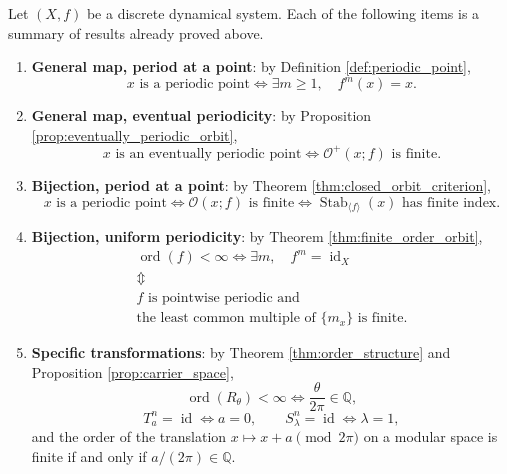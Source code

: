 \begin{theorem}\label{thm:period_type_master_criterion}
Let \((X,f)\) be a discrete dynamical system. Each of the following items is a summary of results already proved above.
\begin{enumerate}[label=(\Alph*)]
    \item \textbf{General map, period at a point}: by Definition \ref{def:periodic_point},
    \[
    x\text{ is a periodic point}
    \iff
    \exists m\ge 1,\quad f^m(x)=x.
    \]
    \item \textbf{General map, eventual periodicity}: by Proposition \ref{prop:eventually_periodic_orbit},
    \[
    x\text{ is an eventually periodic point}
    \iff
    \mathcal O^+(x;f)\text{ is finite}.
    \]
    \item \textbf{Bijection, period at a point}: by Theorem \ref{thm:closed_orbit_criterion},
    \[
    x\text{ is a periodic point}
    \iff
    \mathcal O(x;f)\text{ is finite}
    \iff
    \operatorname{Stab}_{\langle f\rangle}(x)\text{ has finite index}.
    \]
    \item \textbf{Bijection, uniform periodicity}: by Theorem \ref{thm:finite_order_orbit},
    \[
    \begin{gathered}
    \operatorname{ord}(f)<\infty
    \iff \exists m,\quad f^m=\operatorname{id}_X\\
    \Updownarrow\\
    f\text{ is pointwise periodic and}\\
    \text{the least common multiple of }\{m_x\}\text{ is finite}.
    \end{gathered}
    \]
    \item \textbf{Specific transformations}: by Theorem \ref{thm:order_structure} and Proposition \ref{prop:carrier_space},
    \[
    \operatorname{ord}(R_\theta)<\infty
    \iff
    \frac{\theta}{2\pi}\in\mathbb Q,
    \]
    \[
    T_a^n=\operatorname{id}\iff a=0,
    \qquad
    S_\lambda^n=\operatorname{id}\iff \lambda=1,
    \]
    and the order of the translation \(x\mapsto x+a\pmod{2\pi}\) on a modular space is finite if and only if \(a/(2\pi)\in\mathbb Q\).
\end{enumerate}
\end{theorem}


